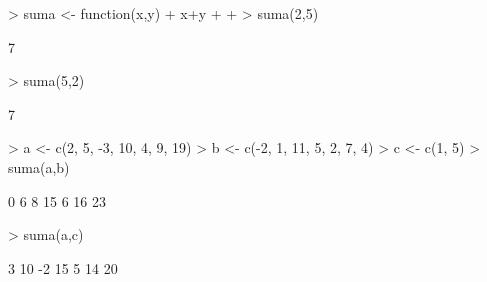 \documentclass{article}
\begin{document}


\begin{Schunk}
\begin{Sinput}
> suma <- function(x,y){
+   x+y
+   
+ }
> suma(2,5)
\end{Sinput}
\begin{Soutput}
[1] 7
\end{Soutput}
\begin{Sinput}
> suma(5,2)
\end{Sinput}
\begin{Soutput}
[1] 7
\end{Soutput}
\begin{Sinput}
> a <- c(2, 5, -3, 10, 4, 9, 19)
> b <- c(-2, 1, 11, 5, 2, 7, 4)
> c <- c(1, 5)
> suma(a,b)
\end{Sinput}
\begin{Soutput}
[1]  0  6  8 15  6 16 23
\end{Soutput}
\begin{Sinput}
> suma(a,c)
\end{Sinput}
\begin{Soutput}
[1]  3 10 -2 15  5 14 20
\end{Soutput}
\end{Schunk}
\end{document}
